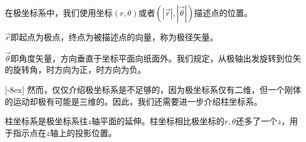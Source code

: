 在极坐标系中，我们使用坐标$(r,\theta)$或者$(|\vec{r}|,|\vec{\theta}|)$描述点的位置。
\begin{Itemize}
	\item $\vec{r}$即起点为极点，终点为被描述点的向量，称为极径矢量。
	\item $\vec{\theta}$即角度矢量，方向垂直于坐标平面向纸面外。我们规定，从极轴出发旋转到位矢的旋转角，时方向为正，时方向为负\footnotemark。
\end{Itemize}
[-8ex]
然而，仅仅介绍极坐标系是不足够的，因为极坐标系仅有二维，但一个刚体的运动却极有可能是三维的。因此，我们还需要进一步介绍柱坐标系。

柱坐标系是极坐标系往$z$轴平面的延伸。柱坐标相比极坐标的$r,\theta$还多了一个$z$，用于指示点在$z$轴上的投影位置。


